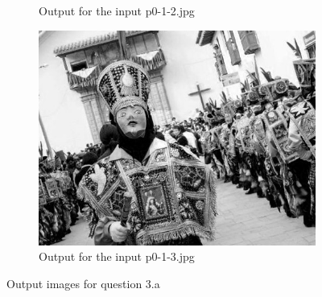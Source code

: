 \begin{enumerate}[label=\emph{\alph*)}]
\begin{figure}[h!]
\begin{subfigure}{0.5\textwidth}
  \caption{Output for the input p0-1-2.jpg}
  \label{fig:sfig1}
\end{subfigure}%
\begin{subfigure}{0.5\textwidth}
  \centering
  \includegraphics[width=0.5\linewidth]{../output/p0-3-a-3.jpg}
  \caption{Output for the input p0-1-3.jpg}
  \label{fig:sfig2}
\end{subfigure}
\caption{Output images for question 3.a}
\label{fig:fig}
\end{figure}


\end{enumerate}
